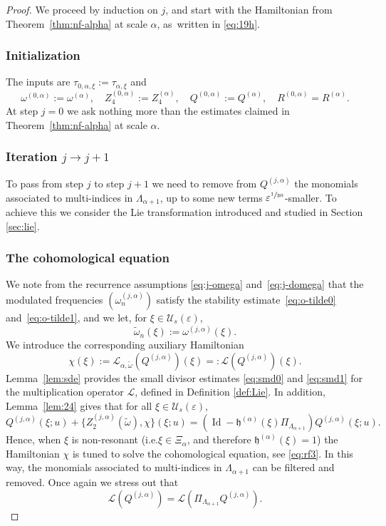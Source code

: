 \documentclass[10pt,a4paper]{amsart}
\providecommand{\ie}{i.e.}
\theoremstyle{plain}
\theoremstyle{definition}
\newcommand{\1}{\mathbf{1}}
\let\epsilon\varepsilon
\begin{document}
\begin{proof} We proceed by induction on $j$, and start with the Hamiltonian from Theorem~\ref{thm:nf-alpha} at scale $\alpha$, as~written in \eqref{eq:19h}.

\subsubsection*{Initialization} The inputs are $\tau_{0,\alpha,\xi} := \tau_{\alpha,\xi}$ and
\[
\omega^{(0,\alpha)} := \omega^{(\alpha)},\quad Z_{4}^{(0,\alpha)} := Z_{4}^{(\alpha)},\quad Q^{(0,\alpha)}:=Q^{(\alpha)},\quad R^{(0,\alpha)}= R^{(\alpha)}.
\]
At step $j=0$ we ask nothing more than the estimates claimed in Theorem~\ref{thm:nf-alpha} at scale $\alpha$.

\subsubsection*{Iteration $j\to j+1$}
To pass from step $j$ to step $j+1$ we need to remove from $Q^{(j,\alpha)}$ the monomials associated to multi-indices in $\Lambda_{\alpha+1}$, up to some new terms $\epsilon^{\sfrac{1}{30}}$\nobreakdash-smaller. To achieve this we consider the Lie transformation introduced and studied in Section \ref{sec:lie}.

\subsubsection*{The cohomological equation} We note from the recurrence assumptions \eqref{eq:j-omega} and~\eqref{eq:j-domega} that the modulated frequencies $(\omega_{n}^{(j,\alpha)})$ satisfy the stability estimate~\eqref{eq:o-tilde0} and~\eqref{eq:o-tilde1}, and we let, for $\xi\in\mathcal{U}_{s}(\epsilon)$,
\[
\widetilde{\omega}_{n}(\xi) := \omega^{(j,\alpha)}(\xi).
\]
We introduce the corresponding auxiliary Hamiltonian
\begin{equation}
\label{eq:coho}
\chi(\xi)
:= \mathcal{L}_{\alpha,\widetilde{\omega}}(Q^{(j,\alpha)})(\xi)
=: \mathcal{L}(Q^{(j,\alpha)})(\xi).
\end{equation}
Lemma~\ref{lem:sde} provides the small divisor estimates \eqref{eq:smd0} and \eqref{eq:smd1} for the multiplication operator $\mathcal{L}$, defined in Definition \ref{def:Lie}. In addition, Lemma~\ref{lem:24} gives that for all $\xi\in\mathcal{U}_{s}(\epsilon)$,
\begin{equation}
\label{eq:cohoQ}
Q^{(j,\alpha)}(\xi;u)
+
\{Z_{2}^{(j,\alpha)}(\widetilde{\omega}),\chi\}(\xi;u)
=(\operatorname{Id}-\mathfrak{h}^{(\alpha)}(\xi)\Pi_{\Lambda_{\alpha+1}})Q^{(j,\alpha)}(\xi;u).
\end{equation}
Hence, when $\xi$ is non-resonant (\ie $\xi\in\Xi_{\alpha}$, and therefore $\mathfrak{h}^{(\alpha)}(\xi)=1$) the Hamiltonian $\chi$ is tuned to solve the cohomological equation, see \eqref{eq:rf3}.
In this way, the monomials associated to multi-indices in $\Lambda_{\alpha+1}$ can be filtered and removed. Once again we stress out that
\[
\mathcal{L}(Q^{(j,\alpha)})
=
\mathcal{L}(\Pi_{\Lambda_{\alpha+1}}Q^{(j,\alpha)}).
\]


\end{proof}
\end{document}
